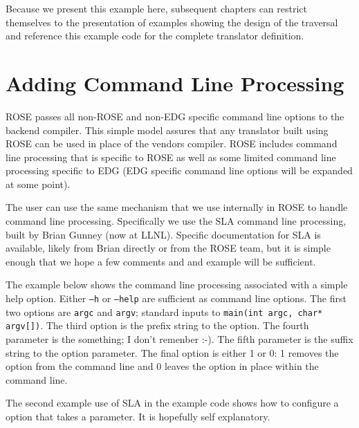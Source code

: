 Because we present this example here, subsequent chapters can restrict themselves to
the presentation of examples showing the design of the traversal and reference this
example code for the complete translator definition.

\section{Adding Command Line Processing}

   ROSE passes all non-ROSE and non-EDG specific command line options to the backend
compiler.  This simple model assures that any translator built using ROSE can be used
in place of the vendors compiler. ROSE includes command line processing that is 
specific to ROSE as well as some limited command line processing specific to EDG
(EDG specific command line options will be expanded at some point).

   The user can use the same mechanism that we use internally in ROSE to handle command
line processing.  Specifically we use the SLA command line processing, built by Brian 
Gunney (now at LLNL).  Specific documentation for SLA is available, likely from Brian 
directly or from the ROSE team, but it is simple enough that we hope a few comments and
and example will be sufficient.

   The example below shows the command line processing associated with a simple
help option.  Either {\tt --h} or {\tt --help} are sufficient as command line options.
The first two options are {\tt argc} and {\tt argv}; standard inputs to 
{\tt main(int argc, char* argv[])}.  The third option is the prefix string to the option.
The fourth parameter is the something; I don't remenber :-).
The fifth parameter is the suffix string to the option parameter.
The final option is either 1 or 0: 1 removes the option from the command line and 0 leaves
the option in place within the command line.

The second example use of SLA in the example code shows how to configure a option that
takes a parameter. It is hopefully self explanatory.

